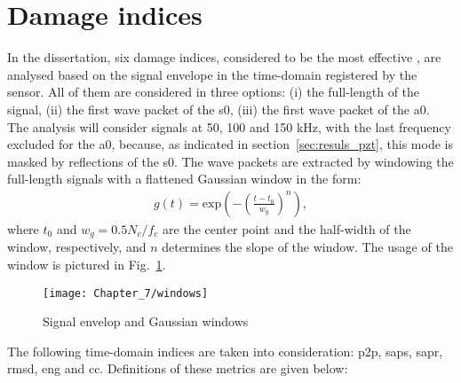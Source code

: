 \section{Damage indices}
\label{sec:di}

In the dissertation, six damage indices, considered to be the most effective \cite{torkamani2014novel, moix2016damage}, are analysed based on the signal envelope in the time-domain registered by the sensor.
All of them are considered in three options: (i) the full-length of the signal, (ii) the first wave packet of the \ac{s0}, (iii) the first wave packet of the \ac{a0}.
The analysis will consider signals at 50, 100 and 150 \unit{\kHz}, with the last frequency excluded for the \ac{a0}, because, as indicated in section~\ref{sec:resuls_pzt}, this mode is masked by reflections of the \ac{s0}.
The wave packets are extracted by windowing the full-length signals with a flattened Gaussian window in the form:
\begin{eqnarray}
	g(t)= \mathrm{exp}\left(-\left(\frac{t-t_0}{w_g}\right) ^{n}\right),
	\label{eq:psi_g}
\end{eqnarray}
%
where \(t_0\) and \(w_g=0.5N_c/f_c\) are the center point and the half-width of the window, respectively, and  \(n\) determines the slope of the window.
The usage of the window is pictured in Fig.~\ref{fig:windows}.
\begin{figure}[!tbh]
	\begin{center}
		\texttt{[image: Chapter\_7/windows]}
	\end{center}
	\caption{Signal envelop and Gaussian windows}
	\label{fig:windows}
\end{figure}


The following time-domain indices are taken into consideration: \ac{p2p}, \ac{saps}, \ac{sapr}, \acf{rmsd}, \ac{eng} and \ac{cc}.
Definitions of these metrics are given below:

